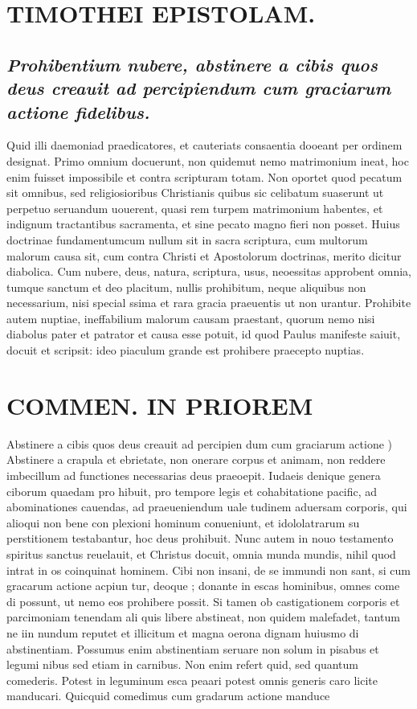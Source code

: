 \documentclass{article}
\begin{document}
\begin{pages}
\section*{TIMOTHEI EPISTOLAM. }
\marginpar{[ p.97 ]}
{}
\subsection*{\textit{Prohibentium nubere, abstinere a cibis quos deus creauit ad percipiendum cum graciarum actione fidelibus. }}\pstart Quid illi daemoniad praedicatores, et cauteriats consaentia dooeant per ordinem designat. Primo omnium docuerunt, non quidemut nemo matrimonium ineat, hoc enim fuisset impossibile et contra scripturam totam. Non oportet quod pecatum sit omnibus, sed religiosioribus Christianis quibus sic celibatum suaserunt ut perpetuo seruandum uouerent, quasi rem turpem matrimonium habentes, et indignum tractantibus sacramenta, et sine pecato magno fieri non posset. Huius doctrinae fundamentumcum nullum sit in sacra scriptura, cum multorum malorum causa sit, cum contra Christi et Apostolorum doctrinas, merito dicitur diabolica. Cum nubere, deus, natura, scriptura, usus, neoessitas approbent omnia, tumque sanctum et deo placitum, nullis prohibitum, neque aliquibus non necessarium, nisi special ssima et rara gracia praeuentis ut non urantur. Prohibite autem nuptiae, ineffabilium malorum causam praestant, quorum nemo nisi diabolus pater et patrator et causa esse potuit, id quod Paulus manifeste saiuit, docuit et scripsit: ideo piaculum grande est prohibere praecepto nuptias.  \pend
\section*{COMMEN. IN PRIOREM }
\marginpar{[ p.98 ]}\pstart Abstinere a cibis quos deus creauit ad percipien dum cum graciarum actione ) Abstinere a crapula et ebrietate, non onerare corpus et animam, non reddere imbecillum ad functiones necessarias deus praeoepit. Iudaeis denique genera ciborum quaedam pro hibuit, pro tempore legis et cohabitatione pacific, ad abominationes cauendas, ad praeueniendum uale tudinem aduersam corporis, qui alioqui non bene con plexioni hominum conueniunt, et idololatrarum su perstitionem testabantur, hoc deus prohibuit. Nunc autem in nouo testamento spiritus sanctus reuelauit, et Christus docuit, omnia munda mundis, nihil quod intrat in os coinquinat hominem. Cibi non insani, de se immundi non sant, si cum gracarum actione acpiun tur, deoque ; donante in escas hominibus, omnes come di possunt, ut nemo eos prohibere possit. Si tamen ob castigationem corporis et parcimoniam tenendam ali quis libere abstineat, non quidem malefadet, tantum ne iin nundum reputet et illicitum et magna oerona dignam huiusmo di abstinentiam. Possumus enim abstinentiam seruare non solum in pisabus et legumi nibus sed etiam in carnibus. Non enim refert quid, sed quantum comederis. Potest in leguminum esca peaari potest omnis generis caro licite manducari. Quicquid comedimus cum gradarum actione manduce\pend

\end{pages}
\end{document}
